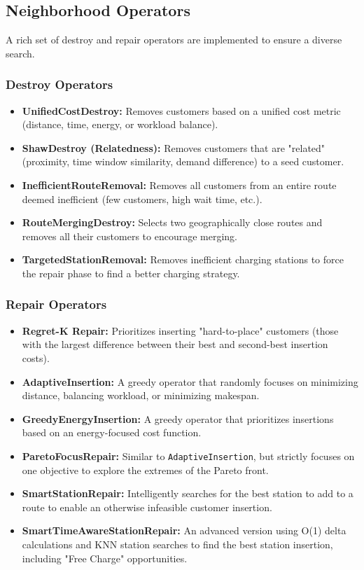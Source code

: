 \documentclass[a4paper,12pt]{article}
\begin{document}
\subsection{Neighborhood Operators}
A rich set of destroy and repair operators are implemented to ensure a diverse search.

\subsubsection{Destroy Operators}
\begin{itemize}
    \item \textbf{UnifiedCostDestroy:} Removes customers based on a unified cost metric (distance, time, energy, or workload balance).
    \item \textbf{ShawDestroy (Relatedness):} Removes customers that are "related" (proximity, time window similarity, demand difference) to a seed customer.
    \item \textbf{InefficientRouteRemoval:} Removes all customers from an entire route deemed inefficient (few customers, high wait time, etc.).
    \item \textbf{RouteMergingDestroy:} Selects two geographically close routes and removes all their customers to encourage merging.
    \item \textbf{TargetedStationRemoval:} Removes inefficient charging stations to force the repair phase to find a better charging strategy.
\end{itemize}

\subsubsection{Repair Operators}
\begin{itemize}
    \item \textbf{Regret-K Repair:} Prioritizes inserting "hard-to-place" customers (those with the largest difference between their best and second-best insertion costs).
    \item \textbf{AdaptiveInsertion:} A greedy operator that randomly focuses on minimizing distance, balancing workload, or minimizing makespan.
    \item \textbf{GreedyEnergyInsertion:} A greedy operator that prioritizes insertions based on an energy-focused cost function.
    \item \textbf{ParetoFocusRepair:} Similar to \texttt{AdaptiveInsertion}, but strictly focuses on one objective to explore the extremes of the Pareto front.
    \item \textbf{SmartStationRepair:} Intelligently searches for the best station to add to a route to enable an otherwise infeasible customer insertion.
    \item \textbf{SmartTimeAwareStationRepair:} An advanced version using O(1) delta calculations and KNN station searches to find the best station insertion, including "Free Charge" opportunities.
\end{itemize}
\end{document}
